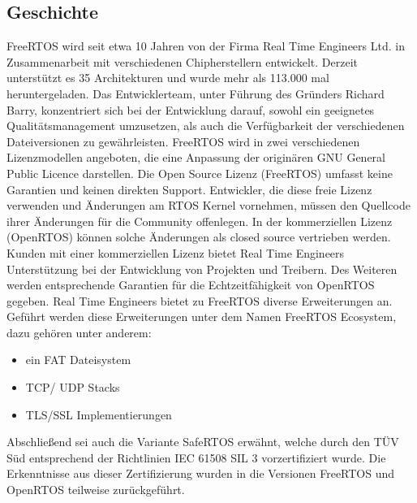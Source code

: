 \subsection{Geschichte}
FreeRTOS wird seit etwa 10 Jahren von der Firma Real Time Engineers Ltd. in Zusammenarbeit mit verschiedenen Chipherstellern entwickelt. Derzeit unterstützt es 35 Architekturen und wurde mehr als 113.000 mal heruntergeladen. Das Entwicklerteam, unter Führung des Gründers Richard Barry, konzentriert sich bei der Entwicklung darauf, sowohl ein geeignetes Qualitätsmanagement umzusetzen, als auch die Verfügbarkeit der verschiedenen Dateiversionen zu gewährleisten. FreeRTOS wird in zwei verschiedenen Lizenzmodellen angeboten, die eine Anpassung der originären GNU General Public Licence darstellen. Die Open Source Lizenz (FreeRTOS) umfasst keine Garantien und keinen direkten Support. Entwickler, die diese freie Lizenz verwenden und Än\-der\-ungen am RTOS Kernel vornehmen, müssen den Quellcode ihrer Än\-der\-ungen für die Community offenlegen. In der kommerziellen Lizenz \newline (OpenRTOS) können solche Änderungen als closed source vertrieben werden. Kunden mit einer kommerziellen Lizenz bietet Real Time Engineers Unterstützung bei der Entwicklung von Projekten und Treibern. Des Weiteren werden entsprechende Garantien für die Echt\-zeit\-fähig\-keit von OpenRTOS gegeben. Real Time Engineers bietet zu FreeRTOS diverse Erweiterungen an. Ge\-führt werden diese Erweiterungen unter dem Namen FreeRTOS Ecosystem, dazu gehören unter anderem:
\begin{itemize}
	\item ein FAT Dateisystem
	\item TCP/ UDP Stacks
	\item TLS/SSL Implementierungen
\end{itemize}
Abschließend sei auch die Variante SafeRTOS erwähnt, welche durch den TÜV Süd entsprechend der Richtlinien IEC 61508 SIL 3 vorzertifiziert wurde. Die Erkenntnisse aus dieser Zertifizierung wurden in die Versionen FreeRTOS und OpenRTOS teilweise zurückgeführt.

